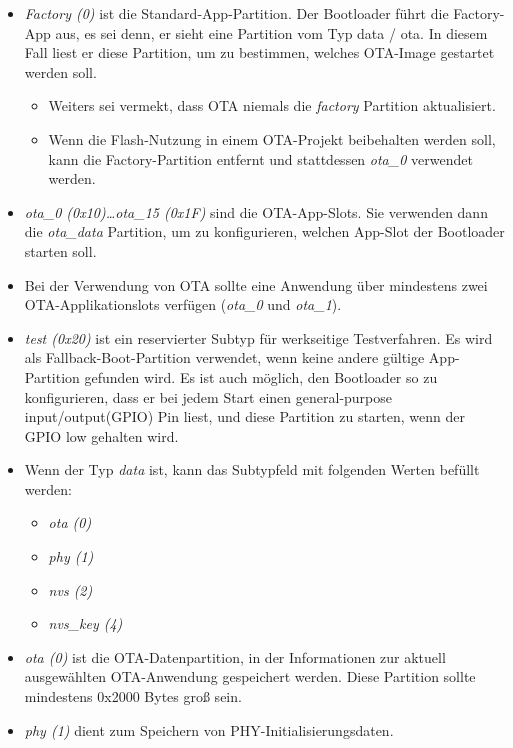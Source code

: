 \begin{itemize}
    \item \textit{Factory (0)} ist die Standard-App-Partition. Der Bootloader führt die Factory-App aus, es sei denn, er sieht eine Partition vom Typ data / ota. In diesem Fall liest er diese Partition, um zu bestimmen, welches OTA-Image gestartet werden soll.
    \begin{itemize}
        \item Weiters sei vermekt, dass OTA niemals die \textit{factory} Partition aktualisiert.
        \item Wenn die Flash-Nutzung in einem OTA-Projekt beibehalten werden soll, kann die Factory-Partition entfernt und stattdessen \textit{ota\_0} verwendet werden.
    \end{itemize}
    \item \textit{ota\_0 (0x10)\dots ota\_15 (0x1F)} sind die OTA-App-Slots. Sie verwenden dann die \textit{ota\_data} Partition, um zu konfigurieren, welchen App-Slot der Bootloader starten soll.
    \item Bei der Verwendung von OTA sollte eine Anwendung über mindestens zwei OTA-Applikationslots verfügen (\textit{ota\_0} und \textit{ota\_1}).
    \item \textit{test (0x20)} ist ein reservierter Subtyp für werkseitige Testverfahren. Es wird als Fallback-Boot-Partition verwendet, wenn keine andere gültige App-Partition gefunden wird. Es ist auch möglich, den Bootloader so zu konfigurieren, dass er bei jedem Start einen general-purpose input/output(\textmd{GPIO}) Pin liest, und diese Partition zu starten, wenn der GPIO \glqq low\grqq{} gehalten wird.
    \pagebreak
    \item Wenn der Typ \textit{data} ist, kann das Subtypfeld mit folgenden Werten befüllt werden:
    \begin{itemize}
        \item \textit{ota (0)}
        \item \textit{phy (1)}
        \item \textit{nvs (2)}
        \item \textit{nvs\_key (4)}
    \end{itemize}
    \item \textit{ota (0)} ist die OTA-Datenpartition, in der Informationen zur aktuell ausgewählten OTA-Anwendung gespeichert werden. Diese Partition sollte mindestens 0x2000 Bytes groß sein.
    \item \textit{phy (1)} dient zum Speichern von PHY-Initialisierungsdaten.

\end{itemize}

